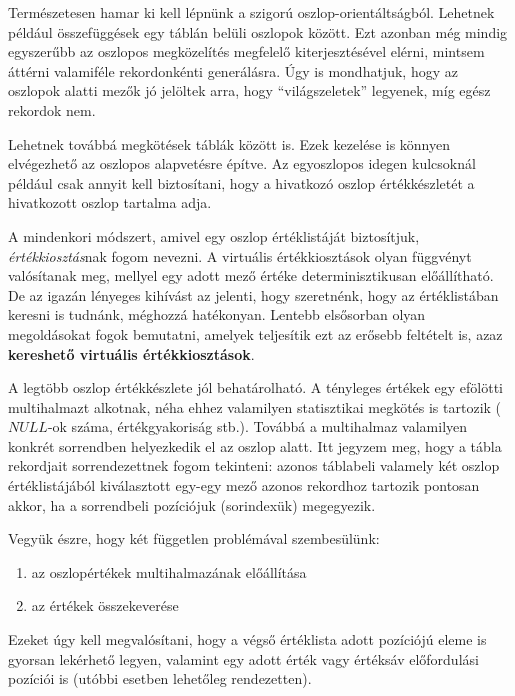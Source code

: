\documentclass[
    parspace,
    noindent,
    nohyp,
]{elteiktdk}[2023/04/10]
\begin{document}
Természetesen hamar ki kell lépnünk a szigorú oszlop-orientáltságból.
Lehetnek például összefüggések egy táblán belüli oszlopok között.
Ezt azonban még mindig egyszerűbb az oszlopos megközelítés megfelelő kiterjesztésével elérni,
mintsem áttérni valamiféle rekordonkénti generálásra.
Úgy is mondhatjuk, hogy az oszlopok alatti mezők jó jelöltek arra, hogy ``világszeletek'' legyenek,
míg egész rekordok nem.

Lehetnek továbbá megkötések táblák között is.
Ezek kezelése is könnyen elvégezhető az oszlopos alapvetésre építve.
Az egyoszlopos idegen kulcsoknál például csak annyit kell biztosítani,
hogy a hivatkozó oszlop értékkészletét a hivatkozott oszlop tartalma adja.

A mindenkori módszert, amivel egy oszlop értéklistáját biztosítjuk,
\textit{értékkiosztás}nak fogom nevezni.
A virtuális értékkiosztások olyan függvényt valósítanak meg,
mellyel egy adott mező értéke determinisztikusan előállítható.
De az igazán lényeges kihívást az jelenti, hogy szeretnénk,
hogy az értéklistában keresni is tudnánk, méghozzá hatékonyan.
Lentebb elsősorban olyan megoldásokat fogok bemutatni,
amelyek teljesítik ezt az erősebb feltételt is,
azaz \textbf{kereshető virtuális értékkiosztások}.

A legtöbb oszlop értékkészlete jól behatárolható.
A tényleges értékek egy efölötti multihalmazt alkotnak,
néha ehhez valamilyen statisztikai megkötés is tartozik ($NULL$-ok száma, értékgyakoriság stb.).
Továbbá a multihalmaz valamilyen konkrét sorrendben helyezkedik el az oszlop alatt.
Itt jegyzem meg, hogy a tábla rekordjait sorrendezettnek fogom tekinteni:
azonos táblabeli valamely két oszlop értéklistájából kiválasztott egy-egy mező
azonos rekordhoz tartozik pontosan akkor, ha a sorrendbeli pozíciójuk (sorindexük) megegyezik.

Vegyük észre, hogy két független problémával szembesülünk:

\begin{enumerate}
    \item az oszlopértékek multihalmazának előállítása
    \item az értékek összekeverése
\end{enumerate}





Ezeket úgy kell megvalósítani, hogy a végső értéklista adott pozíciójú eleme is gyorsan lekérhető legyen,
valamint egy adott érték vagy értéksáv előfordulási pozíciói is
(utóbbi esetben lehetőleg rendezetten).
\end{document}
